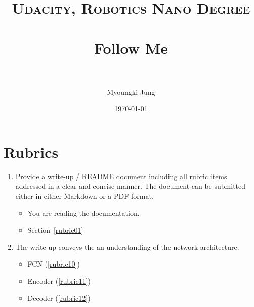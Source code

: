 \documentclass[paper=a4, fontsize=11pt]{scrartcl} %
\title{	
\normalfont \normalsize 
\textsc{Udacity, Robotics Nano Degree} \\ [25pt] %
\horrule{0.5pt} \\[0.4cm] %
\huge Follow Me \\ %
\horrule{2pt} \\[0.5cm] %
}
\author{Myoungki Jung} %
\date{\normalsize\today} %
\numberwithin{equation}{section} %
\numberwithin{figure}{section} %
\numberwithin{table}{section} %
\begin{document}
\maketitle %
\section{Rubrics}

\begin{enumerate}
	\item Provide a write-up / README document including all rubric items addressed in a clear and concise manner. The document can be submitted either in either Markdown or a PDF format.
	\begin{itemize} %
	  \item You are reading the documentation.
	  \item Section~\ref{rubric01}
	\end{itemize}
	\item The write-up conveys the an understanding of the network architecture. 
	\begin{itemize} %
		\item FCN (\ref{rubric10})
		\item Encoder (\ref{rubric11})
		\item Decoder (\ref{rubric12})


\end{itemize}
\end{enumerate}
\end{document}
